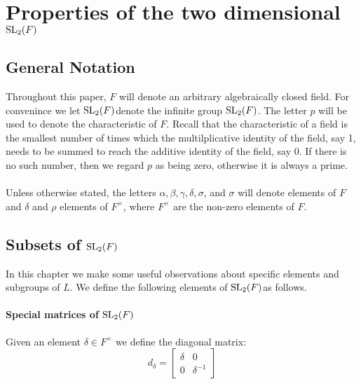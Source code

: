 \chapter{Properties of the two dimensional $\operatorname{SL}_2(F)$}\label{Ch5_PropertiesOfSLOverAlgClosedField}


\section{General Notation}

Throughout this paper, $F$ will denote an arbitrary algebraically closed field. For convenince we let $\operatorname{SL}_2(F)$denote the infinite group $\operatorname{SL}_2(F)$. The letter $p$ will be used to denote the characteristic of $F$. Recall that the characteristic of a field is the smallest number of times which the multilplicative identity of the field, say 1, needs to be summed to reach the additive identity of the field, say 0. If there is no such number, then we regard $p$ as being zero, otherwise it is always a prime. \\
\\
Unless otherwise stated, the letters $\alpha, \beta, \gamma, \delta, \sigma$, and $\sigma$ will denote elements of $F$ and $\delta$ and $\rho$ elements of $F^\times$, where $F^\times$  are the non-zero elements of $F$.

\section{Subsets of $\operatorname{SL}_2(F)$}

In this chapter we make some useful observations about specific elements and subgroups of $L$. We define the following elements of $\operatorname{SL}_2(F)$as follows.

\subsubsection{Special matrices of $\operatorname{SL}_2(F)$}

\begin{definition}
\label{SpecialMatrices.d}
\leanok
    Given an element $\delta \in F^\times$ we define the diagonal matrix:
    \[
    d_\delta = \begin{bmatrix}
        \delta & 0\\
        0 & \delta^{-1}
    \end{bmatrix}
    \]
\end{definition}

